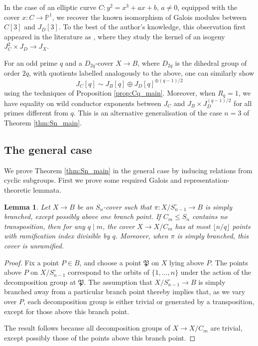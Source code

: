 \documentclass[12pt]{amsart}
\newtheorem{lemma}[theorem]{Lemma}
\theoremstyle{definition}
\newenvironment{remark}
  {\pushQED{\qed}\renewcommand{\qedsymbol}{$\diamondsuit$}\remarkx}
  {\popQED\endremarkx}
\theoremstyle{remark}
\newcommand{\Proj}{\mathbb{P}}
\newcommand{\PP}{\mathfrak{P}}
\begin{document}
\begin{remark}
    In the case of an elliptic curve $C: y^2=x^3+ax+b$, $a\ne0$, equipped with the cover $x: C\to \Proj^1$, we recover the known isomorphism of Galois modules between $C[3]$ and $J_D[3]$. To the best of the author's knowledge, this observation first appeared in the literature as \cite[Lemma 6.9 + Remark 6.10]{DGKM}, where they study the kernel of an isogeny $J_C^2\times J_D \to J_X$.
\end{remark}

\begin{remark}
    For an odd prime $q$ and a $D_{2q}$-cover $X\to B$, where $D_{2q}$ is the dihedral group of order $2q$, with quotients labelled analogously to the above, one can similarly show
    \[ J_C[q] \sim J_B[q] \oplus J_D[q]^{\oplus (q-1)/2} \]
    using the techniques of Proposition \ref{prop:Cq_main}. Moreover, when $R_q=1$, we have equality on wild conductor exponents between $J_C$ and $J_B\times J_D^{(q-1)/2}$ for all primes different from $q$. This is an alternative generalisation of the case $n=3$ of Theorem \ref{thm:Sn_main}.
\end{remark}

\subsection{The general case}

We prove Theorem \ref{thm:Sn_main} in the general case by inducing relations from cyclic subgroups. First we prove some required Galois and representation-theoretic lemmata.

\begin{lemma}\label{lem:ram}
    Let $X\to B$ be an $S_n$-cover such that $\pi:X/S_{n-1}^\circ\to B$ is simply branched, except possibly above one branch point. If $C_m\le S_n$ contains no transposition, then for any $q\mid m$, the cover $X\to X/C_m$ has at most $\lfloor n/q \rfloor$ points with ramification index divisible by $q$. Moreover, when $\pi$ is simply branched, this cover is unramified.
\end{lemma}

\begin{proof}
    Fix a point $P\in B$, and choose a point $\PP$ on $X$ lying above $P$. The points above $P$ on $X/S_{n-1}^\circ$ correspond to the orbits of $\{1,\hdots,n\}$ under the action of the decomposition group at $\PP$. The assumption that $X/S_{n-1}^\circ\to B$ is simply branched away from a particular branch point thereby implies that, as we vary over $P$, each decomposition group is either trivial or generated by a transposition, except for those above this branch point.

    The result follows because all decomposition groups of $X\to X/{C_m}$ are trivial, except possibly those of the points above this branch point.
\end{proof}
\end{document}
